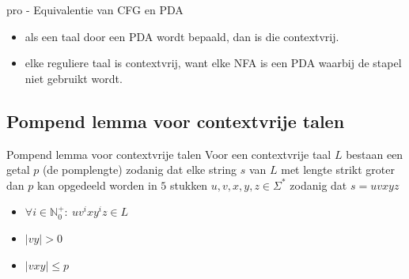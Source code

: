 \begin{pro}{pro - Equivalentie van CFG en PDA}
    \begin{itemize}
        \item als een taal door een PDA wordt bepaald, dan is die contextvrij.
        \item elke reguliere taal is contextvrij, want elke NFA is een PDA waarbij de stapel niet gebruikt wordt.
    \end{itemize}
\end{pro}


\subsection{Pompend lemma voor contextvrije talen}

\vspace{0.5cm}

\begin{lem}{Pompend lemma voor contextvrije talen}
    \vspace{-0.1cm}
    Voor een contextvrije taal $L$ bestaan een getal $p$ (de pomplengte) zodanig dat elke string $s$ van $L$ met lengte
    strikt groter dan $p$ kan opgedeeld worden in $5$ stukken $u,v,x,y,z \in \Sigma^*$ zodanig dat $s = uvxyz$
    \begin{itemize}
        \item $\forall i \in \mathbb{N}_0^+: \ uv^ixy^iz \in L$
        \item $|vy| > 0$
        \item $|vxy| \leq p$
    \end{itemize}
    \vspace{-0.3cm}
\end{lem}

